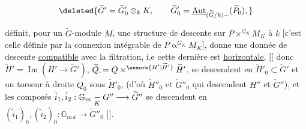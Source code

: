 \[
\deleted{\widetilde G'=\widetilde G'_0\otimes_k K,\qquad
\widetilde G'_0=\underline{\operatorname{Aut}}_{(\widetilde G/k)-}(\widetilde P_0),}
\]

  définit, pour un $\widetilde G$-module $M$, une structure de descente sur $P\mathbin{\times}^{G_K}M_K$ à $k$\unsure{,|;} [c'est celle définie par la connexion intégrable de $P\mathbin{\alpha}^{G_K}M_K$], donne une donnée de descente \uline{compatible} avec la filtration, i.e cette dernière est \uline{horizontale}, $\bigl[\!\bigl[$ donc  $\widetilde H'=\operatorname{Im}(H'\longrightarrow\widetilde G')$, $\widetilde Q,=Q\mathbin{\times}^{\unsure{H'|\widetilde H'}}\widetilde H'$, se descendent  en $\widetilde H'_0\subset\widetilde G'$ et un torseur à droite $Q_0$ sous $\widetilde H'_0$,  (d'où $\widetilde H''_0$ et $\widetilde G''_0$ qui descendent $H''$ et $\widetilde G''$), et  les composés $\tilde i_1,\tilde i_2:\mathbb G_m\underset K{\relbar}G''\longrightarrow\widetilde G''$ se descendent en $(\tilde i_1)_0,(\tilde i_2)_0:\mathbb G_{m\,k}\longrightarrow\widetilde G''_0$ $\bigr]\!\bigr]$.
